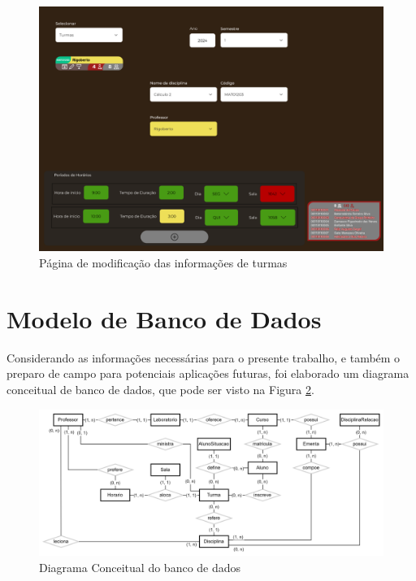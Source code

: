 \begin{figure}[htbp]\centering
  \caption{\label{fig:CRUD_turmas} Página de modificação das informações de turmas}
  \includegraphics[scale=0.6]{files/img/Prototipo/Medio/CRUD_turmas.png}
\end{figure} %

\section{Modelo de Banco de Dados} %

Considerando as informações necessárias para o presente trabalho, e também o preparo de campo para potenciais aplicações futuras, foi elaborado um diagrama conceitual de banco de dados, que pode ser visto na Figura \ref{fig:DiagramConceitual}.

\begin{figure}[htbp]\centering
  \caption{\label{fig:DiagramConceitual} Diagrama Conceitual do banco de dados}
  \includegraphics[scale=0.2]{files/img/DiagramaConceitual/DiagramaConceitualBranco.png}
\end{figure} %

